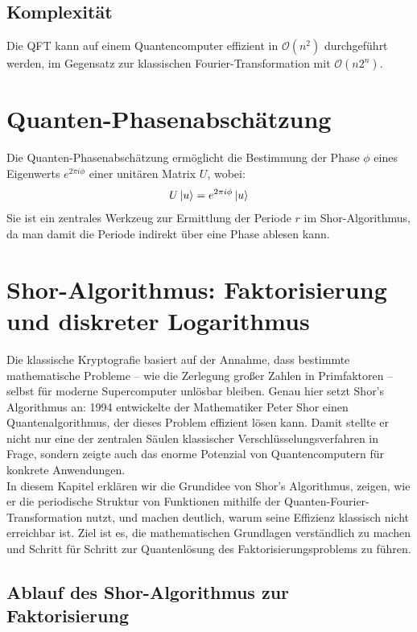 \subsection{Komplexität}
Die QFT kann auf einem Quantencomputer effizient in \( \mathcal{O}(n^2) \) durchgeführt werden, im Gegensatz zur klassischen Fourier-Transformation mit \( \mathcal{O}(n 2^n) \).

\section{Quanten-Phasenabschätzung}

\noindent Die Quanten-Phasenabschätzung ermöglicht die Bestimmung der Phase \( \phi \) eines Eigenwerts \( e^{2\pi i \phi} \) einer unitären Matrix \( U \), wobei:
\[
U \ket{u} = e^{2\pi i \phi} \ket{u}
\]
Sie ist ein zentrales Werkzeug zur Ermittlung der Periode \( r \) im Shor-Algorithmus, da man damit die Periode indirekt über eine Phase ablesen kann.


\section{Shor-Algorithmus: Faktorisierung und diskreter Logarithmus}
\label{first:shor-algorithm}
Die klassische Kryptografie basiert auf der Annahme, dass bestimmte mathematische Probleme – wie die Zerlegung großer Zahlen in Primfaktoren – selbst für moderne Supercomputer unlösbar bleiben. Genau hier setzt Shor’s Algorithmus an: 1994 entwickelte der Mathematiker Peter Shor einen Quantenalgorithmus, der dieses Problem effizient lösen kann. Damit stellte er nicht nur eine der zentralen Säulen klassischer Verschlüsselungsverfahren in Frage, sondern zeigte auch das enorme Potenzial von Quantencomputern für konkrete Anwendungen.\\

\noindent In diesem Kapitel erklären wir die Grundidee von Shor’s Algorithmus, zeigen, wie er die periodische Struktur von Funktionen mithilfe der Quanten-Fourier-Transformation nutzt, und machen deutlich, warum seine Effizienz klassisch nicht erreichbar ist. Ziel ist es, die mathematischen Grundlagen verständlich zu machen und Schritt für Schritt zur Quantenlösung des Faktorisierungsproblems zu führen.\\


\subsection{Ablauf des Shor-Algorithmus zur Faktorisierung}

